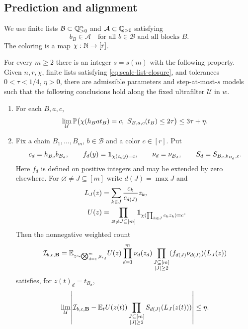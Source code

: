 \subsection{Prediction and alignment}

We use finite lists $\mathcal B\subset\mathbb Q_{>0}^n$ and
$\mathcal A\subset\mathbb Q_{>0}$ satisfying
\begin{equation}\label{eq:scale-list-closure}
 b_B\in\mathcal A\quad\text{for all }b\in\mathcal B
 \text{ and all blocks }B.
\end{equation}
The coloring is a map $\chi:\mathbb N\to[r]$.

\begin{principle}[Prediction]\label{pr:prediction}
For every $m\ge2$ there is an integer $s=s(m)$ with the following
property. Given $n,r,\chi$, finite lists satisfying
\eqref{eq:scale-list-closure}, and tolerances
$0<\tau<1/4$, $\eta>0$, there are admissible parameters and
step-at-most-$s$ models such that the following conclusions hold along
the fixed ultrafilter $\mathcal U$ in $w$.
\begin{enumerate}
\item For each $B,a,c$,
\begin{equation}\label{eq:prediction-calibration}
 \lim_{\mathcal U}\mathbb P\bigl(
 \chi(h_Bat_B)=c,\ S_{B,a,c}(t_B)\le2\tau\bigr)
 \le3\tau+\eta.
\end{equation}
\item Fix a chain $B_1,\ldots,B_m$, $b\in\mathcal B$ and a color
$c\in[r]$. Put
\[
 c_d=h_{B_d}b_{B_d},\qquad
 f_d(y)=\mathbf 1_{\chi(c_dy)=c},\qquad
 \nu_d=\nu_{B_d},\qquad S_d=S_{B_d,b_{B_d},c}.
\]
Here $f_d$ is defined on positive integers and may be extended by zero
elsewhere. For $\varnothing\ne J\subseteq[m]$ write $d(J)=\max J$ and
\begin{align}
 L_J(z)&=\sum_{k\in J}\frac{c_k}{c_{d(J)}}z_k,
 \label{eq:sum-forms}\\
 U(z)&=\prod_{\varnothing\ne J\subseteq[m]}
 \mathbf 1_{\chi(\prod_{k\in J}c_kz_k)=c}.
 \label{eq:product-mask}
\end{align}
Then the nonnegative weighted count
\begin{equation}\label{eq:weighted-count}
 \mathcal I_{b,c,\mathbf B}=
 \mathbb E_{z\sim\bigotimes_{d=1}^m\mu_{i_d}}
 U(z)\prod_{d=1}^m\nu_d(z_d)
 \prod_{\substack{J\subseteq[m]\\|J|\ge2}}
 (f_{d(J)}\nu_{d(J)})(L_J(z))
\end{equation}
satisfies, for $z(t)_d=t_{B_d}$,
\begin{equation}\label{eq:prediction-counting}
 \lim_{\mathcal U}
 \abs*{\mathcal I_{b,c,\mathbf B}
 -\E_t U(z(t))
 \prod_{\substack{J\subseteq[m]\\|J|\ge2}}
 S_{d(J)}(L_J(z(t)))}\le\eta.
\end{equation}
\end{enumerate}
\end{principle}


